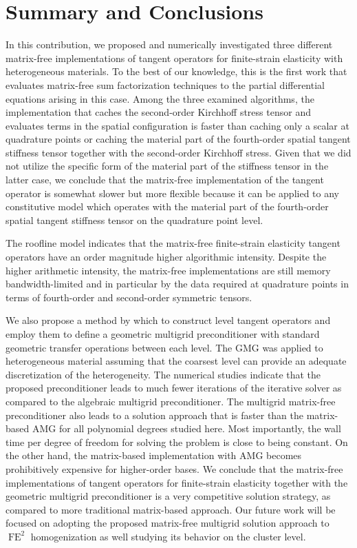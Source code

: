\documentclass[AMA,STIX1COL]{WileyNJD-v2}
\begin{document}
\section{Summary and Conclusions}
\label{sec:summary}

In this contribution, we proposed and numerically investigated three different matrix-free implementations of tangent operators for finite-strain elasticity with heterogeneous materials.
To the best of our knowledge, this is the first work that evaluates matrix-free sum factorization techniques to the partial differential equations arising in this case.
Among the three examined algorithms,
{\color{red}the implementation that caches the second-order Kirchhoff stress tensor and evaluates terms in the spatial configuration is faster than caching only a scalar at quadrature points or caching the material part} of the fourth-order spatial tangent stiffness tensor together with the second-order Kirchhoff stress.
{\color{red}
Given that we did not utilize the specific form of the material part of the stiffness tensor in the latter case, we conclude
that the matrix-free implementation of the tangent operator is somewhat slower but more flexible because it can be applied to any constitutive model which operates with the material part of the fourth-order spatial tangent stiffness tensor on the quadrature point level.
}

The roofline model indicates that the matrix-free finite-strain elasticity tangent operators have an order magnitude higher algorithmic intensity.
{\color{red}
Despite the higher arithmetic intensity, the matrix-free implementations are still memory bandwidth-limited and in particular by the data required at quadrature points in terms of fourth-order and second-order symmetric tensors.
}

We also propose a method by which to construct level tangent operators and employ them to define a geometric multigrid preconditioner
with standard geometric transfer operations between each level.
The GMG was applied to heterogeneous material assuming that the coarsest level can provide an adequate discretization of the heterogeneity.
The numerical studies indicate that the proposed preconditioner
leads to much fewer iterations of the iterative solver as compared to the algebraic multigrid preconditioner.
The multigrid matrix-free preconditioner also
leads to a solution approach that is faster than the matrix-based AMG for all polynomial degrees studied here.
Most importantly, the wall time per degree of freedom for solving the problem is close to being constant.
On the other hand, the matrix-based implementation with AMG becomes prohibitively expensive for higher-order bases.
We conclude that the matrix-free implementations of tangent operators for finite-strain elasticity together with
the geometric multigrid preconditioner is a very competitive solution strategy, as compared to more traditional matrix-based approach.
Our future work will be focused on adopting the proposed matrix-free multigrid solution approach to $\operatorname{FE}^2$ homogenization
as well studying its behavior on the cluster level.
\end{document}
